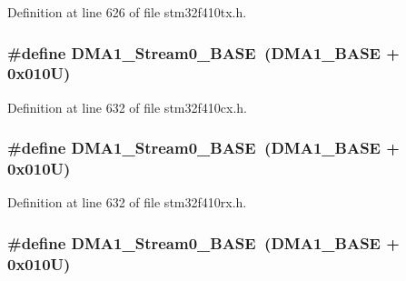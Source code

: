 Definition at line 626 of file stm32f410tx.\+h.

\subsubsection[{\texorpdfstring{D\+M\+A1\+\_\+\+Stream0\+\_\+\+B\+A\+SE}{DMA1_Stream0_BASE}}]{\setlength{\rightskip}{0pt plus 5cm}\#define D\+M\+A1\+\_\+\+Stream0\+\_\+\+B\+A\+SE~({\bf D\+M\+A1\+\_\+\+B\+A\+SE} + 0x010\+U)}\hypertarget{group___peripheral__registers__structures_ga0d3c52aa35dcc68f78b704dfde57ba95}{}\label{group___peripheral__registers__structures_ga0d3c52aa35dcc68f78b704dfde57ba95}


Definition at line 632 of file stm32f410cx.\+h.

\subsubsection[{\texorpdfstring{D\+M\+A1\+\_\+\+Stream0\+\_\+\+B\+A\+SE}{DMA1_Stream0_BASE}}]{\setlength{\rightskip}{0pt plus 5cm}\#define D\+M\+A1\+\_\+\+Stream0\+\_\+\+B\+A\+SE~({\bf D\+M\+A1\+\_\+\+B\+A\+SE} + 0x010\+U)}\hypertarget{group___peripheral__registers__structures_ga0d3c52aa35dcc68f78b704dfde57ba95}{}\label{group___peripheral__registers__structures_ga0d3c52aa35dcc68f78b704dfde57ba95}


Definition at line 632 of file stm32f410rx.\+h.

\subsubsection[{\texorpdfstring{D\+M\+A1\+\_\+\+Stream0\+\_\+\+B\+A\+SE}{DMA1_Stream0_BASE}}]{\setlength{\rightskip}{0pt plus 5cm}\#define D\+M\+A1\+\_\+\+Stream0\+\_\+\+B\+A\+SE~({\bf D\+M\+A1\+\_\+\+B\+A\+SE} + 0x010\+U)}\hypertarget{group___peripheral__registers__structures_ga0d3c52aa35dcc68f78b704dfde57ba95}{}\label{group___peripheral__registers__structures_ga0d3c52aa35dcc68f78b704dfde57ba95}


